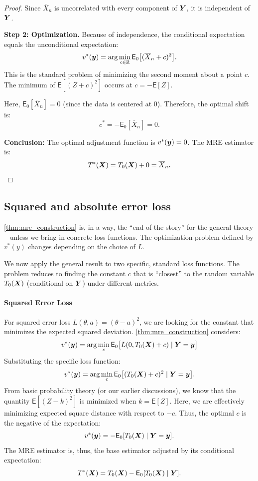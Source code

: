 \begin{ex}
\begin{proof}
Since \(\overline{X}_n\) is uncorrelated with every component of \(\boldsymbol{Y}\), it is independent of \(\boldsymbol{Y}\).

\textbf{Step 2: Optimization.}
Because of independence, the conditional expectation equals the unconditional expectation:
\[
v^*(\boldsymbol{y}) = \arg\min_{c \in \mathbb{R}} \mathsf{E}_0 \big[ (\overline{X}_n + c)^2 \big].
\]
This is the standard problem of minimizing the second moment about a point \(c\). The minimum of \(\mathsf{E}[(Z+c)^2]\) occurs at \(c = -\mathsf{E}[Z]\).

Here, \(\mathsf{E}_0[\overline{X}_n] = 0\) (since the data is centered at 0). Therefore, the optimal shift is:
\[
c^* = -\mathsf{E}_0[\overline{X}_n] = 0.
\]

\textbf{Conclusion:}
The optimal adjustment function is \(v^*(\boldsymbol{y}) = 0\). The MRE estimator is:
\[
T^*(\boldsymbol{X}) = T_0(\boldsymbol{X}) + 0 = \overline{X}_n.
\]
\end{proof}
\end{ex}

\subsection{Squared and absolute error loss}
\label{par:sq_abs_error_loss}

\autoref{thm:mre_construction} is, in a way, the ``end of the story'' for the general theory -- unless we bring in concrete loss functions. The optimization problem defined by $v^*(y)$ changes depending on the choice of $L$.

We now apply the general result to two specific, standard loss functions. The problem reduces to finding the constant $c$ that is ``closest'' to the random variable $T_0(\boldsymbol{X})$ (conditional on $\boldsymbol{Y}$) under different metrics.



\paragraph{Squared Error Loss}
For squared error loss $L(\theta, a) = (\theta - a)^2$, we are looking for the constant that minimizes the expected squared deviation. \autoref{thm:mre_construction} considers:
\[
v^{*}(\boldsymbol{y}) = \arg\min_{c} \mathsf{E}_{0} \big[ L(0, T_{0}(\boldsymbol{X}) + c) \mid \boldsymbol{Y}=\boldsymbol{y} \big]
\]
Substituting the specific loss function:
\[
v^{*}(\boldsymbol{y})= \arg\min_{c} \mathsf{E}_{0} \big[ (T_{0}(\boldsymbol{X}) + c)^{2} \mid \boldsymbol{Y}=\boldsymbol{y} \big].
\]
From basic probability theory (or our earlier discussions), we know that the quantity $\mathsf{E}[(Z - k)^2]$ is minimized when $k = \mathsf{E}[Z]$. Here, we are effectively minimizing expected square distance with respect to $-c$. Thus, the optimal $c$ is the negative of the expectation:
\[
v^*(\boldsymbol{y}) = -\mathsf{E}_{0} [T_{0}(\boldsymbol{X}) \mid \boldsymbol{Y}=\boldsymbol{y}].
\]
The MRE estimator is, thus, the base estimator adjusted by its conditional expectation:
\begin{equation}
T^*(\boldsymbol{X}) = T_0(\boldsymbol{X}) - \mathsf{E}_0[T_0(\boldsymbol{X}) \mid \boldsymbol{Y}].
\label{eq:mre_squared_error}
\end{equation}

